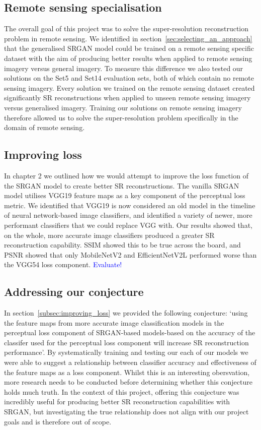 \subsection{Remote sensing specialisation}
The overall goal of this project was to solve the super-resolution reconstruction problem in remote sensing. We identified in section~\ref{sec:selecting_an_approach} that the generalised SRGAN model could be trained on a remote sensing specific dataset with the aim of producing better results when applied to remote sensing imagery versus general imagery. To measure this difference we also tested our solutions on the Set5 and Set14 evaluation sets, both of which contain no remote sensing imagery. Every solution we trained on the remote sensing dataset created significantly SR reconstructions when applied to unseen remote sensing imagery versus generalised imagery. Training our solutions on remote sensing imagery therefore allowed us to solve the super-resolution problem specifically in the domain of remote sensing.

\subsection{Improving loss}
In chapter 2 we outlined how we would attempt to improve the loss function of the SRGAN model to create better SR reconstructions. The vanilla SRGAN model utilises VGG19 feature maps as a key component of the perceptual loss metric. We identified that VGG19 is now considered an old model in the timeline of neural network-based image classifiers, and identified a variety of newer, more performant classifiers that we could replace VGG with. Our results showed that, on the whole, more accurate image classifiers produced a greater SR reconstruction capability. SSIM showed this to be true across the board, and PSNR showed that only MobileNetV2 and EfficientNetV2L performed worse than the VGG54 loss component. \textcolor{blue}{Evaluate!}

\subsection{Addressing our conjecture}
In section~\ref{subsec:improving_loss} we provided the following conjecture: `using the feature maps from more accurate image classification models in the perceptual loss component of SRGAN-based models-based on the accuracy of the classifer used for the perceptual loss component will increase SR reconstruction performance'. By systematically training and testing our each of our models we were able to suggest a relationship between classifier accuracy and effectiveness of the feature maps as a loss component. Whilst this is an interesting obersvation, more research needs to be conducted before determining whether this conjecture holds much truth. In the context of this project, offering this conjecture was incredibly useful for producing better SR reconstruction capabilities with SRGAN, but investigating the true relationship does not align with our project goals and is therefore out of scope.


